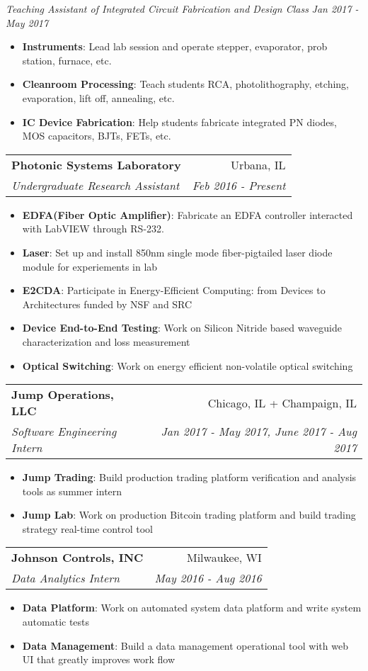 \documentclass[hidelinks,letterpaper,11pt]{article} %
\makeatletter
\newcommand{\resumeItem}[2]{
  \item\small{
    \textbf{#1}{: #2 \vspace{-2pt}}
  }
}
\newcommand{\positionHeader}[2]{
    \hspace{-8pt}
    \vspace{2pt}  
    \begin{small}
      \textit{#1} \hfill \textit{#2} \ \ \ \\
    \end{small}
}
\newcommand{\resumeSubheading}[4]{
  \vspace{-1pt}\item
    \begin{tabular*}{0.97\textwidth}{l@{\extracolsep{\fill}}r}
      \textbf{#1} & #2 \\
      \textit{\small#3} & \textit{\small #4} \\
    \end{tabular*}\vspace{-5pt}
}
\newcommand{\resumeItemListStart}{\begin{itemize}}
\newcommand{\resumeItemListEnd}{\end{itemize}\vspace{-5pt}}
\makeatother
\begin{document}
      \vspace{-1pt}
      \positionHeader{Teaching Assistant of Integrated Circuit Fabrication and Design Class}{Jan 2017 - May 2017}
      \vspace{-5pt}
      \resumeItemListStart
        \resumeItem{Instruments}
          {Lead lab session and operate stepper, evaporator, prob station, furnace, etc.}
        \resumeItem{Cleanroom Processing}
        {Teach students RCA, photolithography, etching, evaporation, lift off, annealing, etc.} 
        \resumeItem{IC Device Fabrication}
        {Help students fabricate integrated PN diodes, MOS capacitors, BJTs, FETs, etc.}
      \resumeItemListEnd

    \resumeSubheading
      {Photonic Systems Laboratory}{Urbana, IL}
      {Undergraduate Research Assistant}{Feb 2016 - Present}
      \resumeItemListStart
        \resumeItem{EDFA(Fiber Optic Amplifier)}
          {Fabricate an EDFA controller interacted with LabVIEW through RS-232. }
        \resumeItem{Laser}
          {Set up and install 850nm single mode fiber-pigtailed laser diode module for experiements in lab }
        \resumeItem{E2CDA}
          {Participate in Energy-Efficient Computing: from Devices to Architectures funded by NSF and SRC}
        \resumeItem{Device End-to-End Testing}
          {Work on Silicon Nitride based waveguide characterization and loss measurement}
        \resumeItem{Optical Switching}
          {Work on energy efficient non-volatile optical switching}
      \resumeItemListEnd

    \resumeSubheading
      {Jump Operations, LLC}{Chicago, IL + Champaign, IL}
      {Software Engineering Intern}{Jan 2017 - May 2017, June 2017 - Aug 2017}
      \resumeItemListStart
        \resumeItem{Jump Trading}
        {Build production trading platform verification and analysis tools as summer intern}
        \resumeItem{Jump Lab}
        {Work on production Bitcoin trading platform and build trading strategy real-time control tool} 
      \resumeItemListEnd

    \resumeSubheading
      {Johnson Controls, INC}{Milwaukee, WI}
      {Data Analytics Intern}{May 2016 - Aug 2016}
      \resumeItemListStart
        \resumeItem{Data Platform}
        {Work on automated system data platform and write system automatic tests }
        \resumeItem{Data Management}
        {Build a data management operational tool with web UI that greatly improves work flow}
      \resumeItemListEnd
\end{document}
